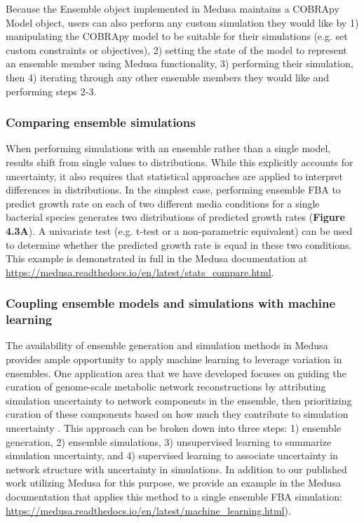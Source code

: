 \documentclass[11pt,onecolumn,notitlepage,openany,twoside]{book}
\begin{document}
\begin{refsection}
Because the Ensemble object implemented in Medusa maintains a COBRApy Model object, users can also perform any custom simulation they would like by 1) manipulating the COBRApy model to be suitable for their simulations (e.g. set custom constraints or objectives), 2) setting the state of the model to represent an ensemble member using Medusa functionality, 3) performing their simulation, then 4) iterating through any other ensemble members they would like and performing steps 2-3.

\subsubsection{Comparing ensemble simulations}

When performing simulations with an ensemble rather than a single model, results shift from single values to distributions. While this explicitly accounts for uncertainty, it also requires that statistical approaches are applied to interpret differences in distributions. In the simplest case, performing ensemble FBA to predict growth rate on each of two different media conditions for a single bacterial species generates two distributions of predicted growth rates (\textbf{Figure 4.3A}). A univariate test (e.g. t-test or a non-parametric equivalent) can be used to determine whether the predicted growth rate is equal in these two conditions. This example is demonstrated in full in the Medusa documentation at \url{https://medusa.readthedocs.io/en/latest/stats_compare.html}.

\subsubsection{Coupling ensemble models and simulations with machine learning}

The availability of ensemble generation and simulation methods in Medusa provides ample opportunity to apply machine learning to leverage variation in ensembles. One application area that we have developed focuses on guiding the curation of genome-scale metabolic network reconstructions by attributing simulation uncertainty to network components in the ensemble, then prioritizing curation of these components based on how much they contribute to simulation uncertainty \cite{Medlock2018-kx}. This approach can be broken down into three steps: 1) ensemble generation, 2) ensemble simulations, 3) unsupervised learning to summarize simulation uncertainty, and 4) supervised learning to associate uncertainty in network structure with uncertainty in simulations. In addition to our published work utilizing Medusa for this purpose, we provide an example in the Medusa documentation that applies this method to a single ensemble FBA simulation: \url{https://medusa.readthedocs.io/en/latest/machine_learning.html}).


\end{refsection}
\end{document}
